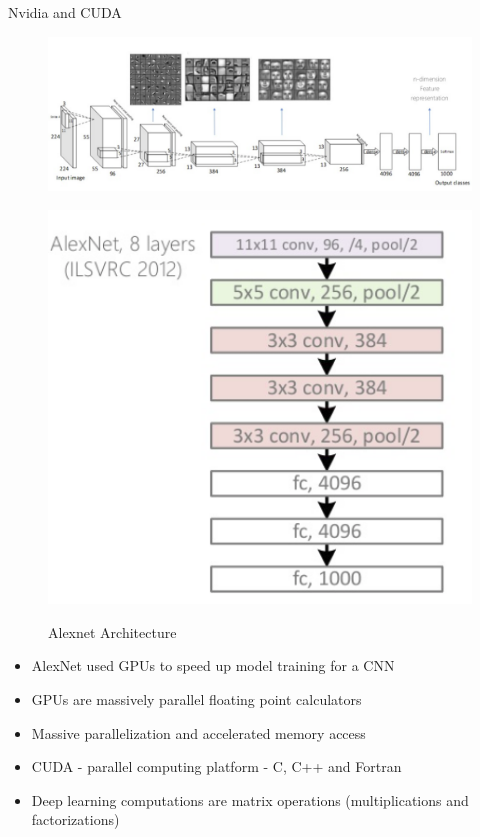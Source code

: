 \documentclass[10pt]{beamer}
\begin{document}
\begin{frame}{Nvidia and CUDA}
  \begin{figure}
    \centering
    \begin{minipage}{.5\textwidth}
      \centering
      \includegraphics[width=\linewidth]{alexnet.png}
      \label{fig:test1}
    \end{minipage}%
    \begin{minipage}{.5\textwidth}
      \centering
      \includegraphics[width=.6\linewidth]{alexnet2.png}
      \label{fig:test2}
    \end{minipage}
    \caption{Alexnet Architecture \cite{krizhevsky2012imagenet}}
  \end{figure}
  \begin{itemize}
  \item AlexNet used GPUs to speed up model training for a CNN
  \item GPUs are massively parallel floating point calculators
  \item Massive parallelization and accelerated memory access
  \item CUDA - parallel computing platform - C, C++ and Fortran
  \item Deep learning computations are matrix operations (multiplications and factorizations)
  \end{itemize}
\end{frame}
\end{document}
